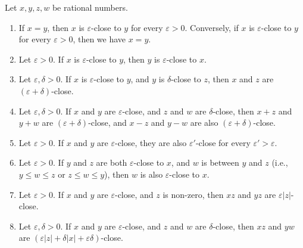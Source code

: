 \setcounter{theorem}{6}
\begin{proposition}\label{4.3.7}
Let \(x, y, z, w\) be rational numbers.
\begin{enumerate}
    \item If \(x = y\), then \(x\) is \(\varepsilon\)-close to \(y\) for every \(\varepsilon > 0\).
    Conversely, if \(x\) is \(\varepsilon\)-close to \(y\) for every \(\varepsilon > 0\), then we have \(x = y\).
    \item Let \(\varepsilon > 0\).
    If \(x\) is \(\varepsilon\)-close to \(y\), then \(y\) is \(\varepsilon\)-close to \(x\).
    \item Let \(\varepsilon, \delta > 0\).
    If \(x\) is \(\varepsilon\)-close to \(y\), and \(y\) is \(\delta\)-close to \(z\), then \(x\) and \(z\) are \((\varepsilon + \delta)\)-close.
    \item Let \(\varepsilon, \delta > 0\).
    If \(x\) and \(y\) are \(\varepsilon\)-close, and \(z\) and \(w\) are \(\delta\)-close, then \(x + z\) and \(y + w\) are \((\varepsilon + \delta)\)-close, and \(x - z\) and \(y - w\) are also \((\varepsilon + \delta)\)-close.
    \item Let \(\varepsilon > 0\).
    If \(x\) and \(y\) are \(\varepsilon\)-close, they are also \(\varepsilon'\)-close for every \(\varepsilon' > \varepsilon\).
    \item Let \(\varepsilon > 0\).
    If \(y\) and \(z\) are both \(\varepsilon\)-close to \(x\), and \(w\) is between \(y\) and \(z\) (i.e., \(y \leq w \leq z\) or \(z \leq w \leq y\)), then \(w\) is also \(\varepsilon\)-close to \(x\).
    \item Let \(\varepsilon > 0\).
    If \(x\) and \(y\) are \(\varepsilon\)-close, and \(z\) is non-zero, then \(xz\) and \(yz\) are \(\varepsilon|z|\)-close.
    \item Let \(\varepsilon, \delta > 0\).
    If \(x\) and \(y\) are \(\varepsilon\)-close, and \(z\) and \(w\) are \(\delta\)-close, then \(xz\) and \(yw\) are \((\varepsilon|z| + \delta|x| + \varepsilon\delta)\)-close.
\end{enumerate}
\end{proposition}

